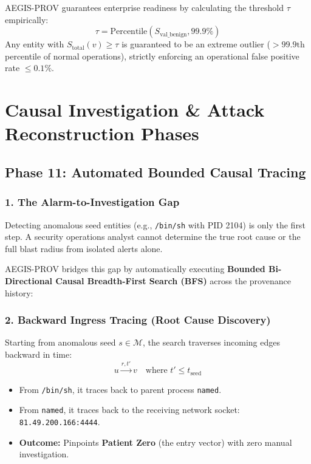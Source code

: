 \documentclass[11pt,a4paper]{report}
\begin{document}
AEGIS-PROV guarantees enterprise readiness by calculating the threshold $\tau$ empirically:
$$\tau = \text{Percentile}\left( S_{\text{val\_benign}}, 99.9\% \right)$$
Any entity with $S_{\text{total}}(v) \ge \tau$ is guaranteed to be an extreme outlier ($> 99.9\text{th}$ percentile of normal operations), strictly enforcing an operational false positive rate $\le 0.1\%$.

\chapter{Causal Investigation \& Attack Reconstruction Phases}

\section{Phase 11: Automated Bounded Causal Tracing}

\subsection{1. The Alarm-to-Investigation Gap}
Detecting anomalous seed entities (e.g., \texttt{/bin/sh} with PID 2104) is only the first step. A security operations analyst cannot determine the true root cause or the full blast radius from isolated alerts alone. 

AEGIS-PROV bridges this gap by automatically executing \textbf{Bounded Bi-Directional Causal Breadth-First Search (BFS)} across the provenance history:

\subsection{2. Backward Ingress Tracing (Root Cause Discovery)}
Starting from anomalous seed $s \in \mathcal{M}$, the search traverses incoming edges backward in time:
$$u \xrightarrow{r, t'} v \quad \text{where } t' \le t_{\text{seed}}$$
\begin{itemize}
    \item From \texttt{/bin/sh}, it traces back to parent process \texttt{named}.
    \item From \texttt{named}, it traces back to the receiving network socket: \texttt{81.49.200.166:4444}.
    \item \textbf{Outcome:} Pinpoints \textbf{Patient Zero} (the entry vector) with zero manual investigation.
\end{itemize}
\end{document}

